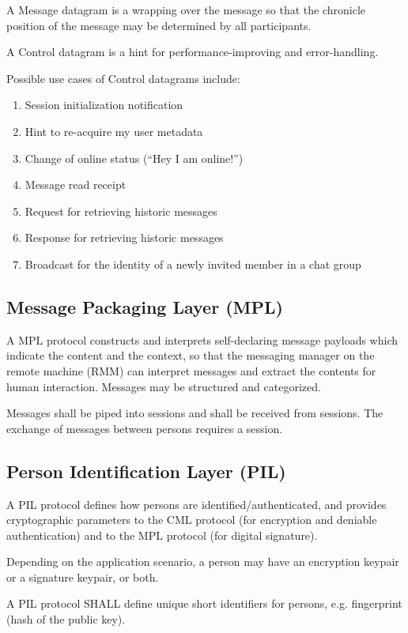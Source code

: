 \documentclass[a4paper,11pt]{article}
\begin{document}
A Message datagram is a wrapping over the message so that the chronicle position of the message may be determined by all participants.

A Control datagram is a hint for performance-improving and error-handling.

Possible use cases of Control datagrams include:

\begin{enumerate}
    \item Session initialization notification
    \item Hint to re-acquire my user metadata
    \item Change of online status (``Hey I am online!'')
    \item Message read receipt
    \item Request for retrieving historic messages
    \item Response for retrieving historic messages
    \item Broadcast for the identity of a newly invited member in a chat group
\end{enumerate}

\subsection{Message Packaging Layer (MPL)}

A MPL protocol constructs and interprets self-declaring message payloads which indicate the content and the context,
so that the messaging manager on the remote machine (RMM) can interpret messages and extract the contents for human interaction.
Messages may be structured and categorized.

Messages shall be piped into sessions and shall be received from sessions.
The exchange of messages between persons requires a session.

\subsection{Person Identification Layer (PIL)}

A PIL protocol defines how persons are identified/authenticated,
and provides cryptographic parameters to the CML protocol (for encryption and deniable authentication)
and to the MPL protocol (for digital signature).

Depending on the application scenario, a person may have an encryption keypair or a signature keypair, or both.

A PIL protocol SHALL define unique short identifiers for persons, e.g. fingerprint (hash of the public key).
\end{document}
